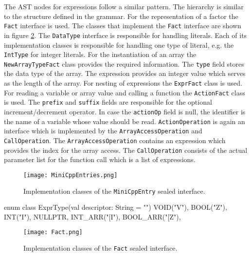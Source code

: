 The AST nodes for expressions follow a similar pattern. The hierarchy is similar to the structure defined in the grammar. For the representation of a factor the \verb|Fact| interface is used. The classes that implement the \verb|Fact| interface are shown in figure \ref{fig:FactDiag}. The \verb|DataType| interface is responsible for handling literals. Each of its implementation classes is responsible for handling one type of literal, e.g. the \verb|IntType| for integer literals. For the instantiation of an array the \verb|NewArrayTypeFact| class provides the required information. The \verb|type| field stores the data type of the array. The expression provides an integer value which serves as the length of the array. For nesting of expressions the \verb|ExprFact| class is used. For reading a variable or array value and calling a function the \verb|ActionFact| class is used. The \verb|prefix| and \verb|suffix| fields are responsible for the optional increment/decrement operator. In case the \verb|actionOp| field is null, the identifier is the name of a variable whose value should be read. \verb|ActionOperation| is again an interface which is implemented by the \verb|ArrayAccessOperation| and \verb|CallOperation|. The \verb|ArrayAccessOperation| contains an expression which provides the index for the array access. The \verb|CallOperation| consists of the actual parameter list for the function call which is a list of expressions.

\begin{figure}[]
       \centering
       \texttt{[image: MiniCppEntries.png]}
       \caption{Implementation classes of the \texttt{MiniCppEntry} sealed interface.}
       \label{fig:MiniCppEntriesDiag}
\end{figure}

\begin{KotlinCode}[float,numbers=none,caption=Implementation of the \texttt{ExprType} enum., label=lst:ListExprType]
       enum class ExprType(val descriptor: String = "") {
              VOID("V"),
              BOOL("Z"),
              INT("I"),
              NULLPTR,
              INT_ARR("[I"),
              BOOL_ARR("[Z"),
          }
\end{KotlinCode}

\begin{figure}[]
       \centering
       \texttt{[image: Fact.png]}
       \caption{Implementation classes of the \texttt{Fact} sealed interface.}
       \label{fig:FactDiag}
\end{figure}

